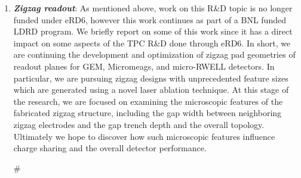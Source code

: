 \begin{enumerate}
\item	\textbf{\emph{Zigzag readout}}: As mentioned above, work on this R\&D topic is no longer funded under eRD6, however this work continues as part of a BNL funded LDRD program. We briefly report on some of this work since it has a direct impact on some aspects of the TPC R\&D done through eRD6. In short, we are continuing the development and optimization of zigzag pad geometries of readout planes for GEM, Micromeags, and micro-RWELL detectors. In particular, we are pursuing zigzag designs with unprecedented feature sizes which are generated using a novel laser ablation technique. At this stage of the research, we are focused on examining the microscopic features of the fabricated zigzag structure, including the gap width between neighboring zigzag electrodes and the gap trench depth and the overall topology. Ultimately we hope to discover how such microscopic features influence charge sharing and the overall detector performance. 



#\end{enumerate}